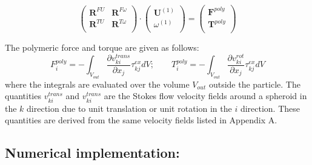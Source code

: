 \documentclass{jfm}
\begin{document}
\begin{equation}
\label{eq:Resistance_Order_Beta}
\left(\begin{array}{cc}
\boldsymbol{R}^{FU} & \boldsymbol{R}^{F\omega}   \\
\boldsymbol{R}^{TU} & \boldsymbol{R}^{T\omega} \\
\end{array}\right) \cdot \left(\begin{array}{c}
\boldsymbol{U}^{(1)} \\
\omega^{(1)} \\
\end{array}\right)=\left(\begin{array}{c}
\boldsymbol{F}^{poly} \\
\boldsymbol{T}^{poly} \\
\end{array}\right)
\end{equation}

The polymeric force and torque are given as follows:
\begin{equation}
\label{eq:PolyForceTorque}
    F_i^{poly} = -\int_{V_{out}}\frac{\partial v_{ki}^{trans}}{\partial x_j}\tau_{kj}^{ex} dV ; \qquad T_i^{poly}= -\int_{V_{out}}\frac{\partial v_{ki}^{rot}}{\partial x_j}\tau_{kj}^{ex} dV
\end{equation}
where the integrals are evaluated over the volume $V_{out}$ outside the particle.  The quantities $v_{ki}^{trans}$ and $v_{ki}^{trans}$ are the Stokes flow velocity fields around a spheroid in the $k$ direction due to unit translation or unit rotation in the $i$ direction.  These quantities are derived from the same velocity fields listed in Appendix A.

\subsection{Numerical implementation:}
\end{document}
